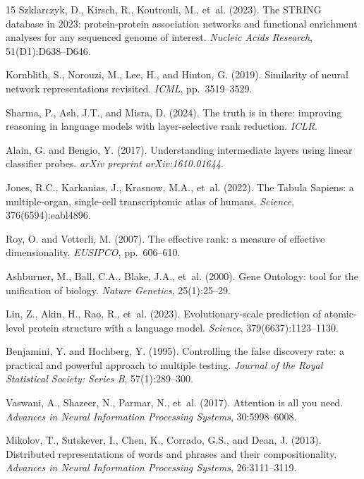 \documentclass[12pt]{article}
\begin{document}
\begin{thebibliography}{15}
Szklarczyk, D., Kirsch, R., Koutrouli, M., et~al. (2023).
The STRING database in 2023: protein-protein association networks and functional enrichment analyses for any sequenced genome of interest.
\textit{Nucleic Acids Research}, 51(D1):D638--D646.

Kornblith, S., Norouzi, M., Lee, H., and Hinton, G. (2019).
Similarity of neural network representations revisited.
\textit{ICML}, pp.\ 3519--3529.

Sharma, P., Ash, J.T., and Misra, D. (2024).
The truth is in there: improving reasoning in language models with layer-selective rank reduction.
\textit{ICLR}.

Alain, G. and Bengio, Y. (2017).
Understanding intermediate layers using linear classifier probes.
\textit{arXiv preprint arXiv:1610.01644}.

Jones, R.C., Karkanias, J., Krasnow, M.A., et~al. (2022).
The Tabula Sapiens: a multiple-organ, single-cell transcriptomic atlas of humans.
\textit{Science}, 376(6594):eabl4896.

Roy, O. and Vetterli, M. (2007).
The effective rank: a measure of effective dimensionality.
\textit{EUSIPCO}, pp.\ 606--610.

Ashburner, M., Ball, C.A., Blake, J.A., et~al. (2000).
Gene Ontology: tool for the unification of biology.
\textit{Nature Genetics}, 25(1):25--29.

Lin, Z., Akin, H., Rao, R., et~al. (2023).
Evolutionary-scale prediction of atomic-level protein structure with a language model.
\textit{Science}, 379(6637):1123--1130.

Benjamini, Y. and Hochberg, Y. (1995).
Controlling the false discovery rate: a practical and powerful approach to multiple testing.
\textit{Journal of the Royal Statistical Society: Series B}, 57(1):289--300.

Vaswani, A., Shazeer, N., Parmar, N., et~al. (2017).
Attention is all you need.
\textit{Advances in Neural Information Processing Systems}, 30:5998--6008.

Mikolov, T., Sutskever, I., Chen, K., Corrado, G.S., and Dean, J. (2013).
Distributed representations of words and phrases and their compositionality.
\textit{Advances in Neural Information Processing Systems}, 26:3111--3119.


\end{thebibliography}
\end{document}
